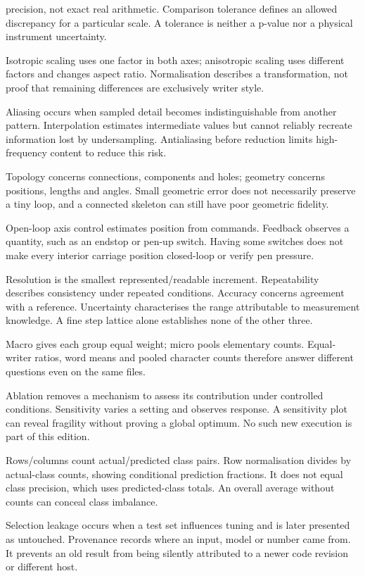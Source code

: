 \begin{description}[style=nextline]
precision, not exact real arithmetic. Comparison tolerance defines an allowed
discrepancy for a particular scale. A tolerance is neither a p-value nor a
physical instrument uncertainty.
\item[Isotropic versus anisotropic.] Isotropic scaling uses one factor in
both axes; anisotropic scaling uses different factors and changes aspect ratio.
Normalisation describes a transformation, not proof that remaining differences
are exclusively writer style.
\item[Aliasing and interpolation.] Aliasing occurs when sampled detail becomes
indistinguishable from another pattern. Interpolation estimates intermediate
values but cannot reliably recreate information lost by undersampling.
Antialiasing before reduction limits high-frequency content to reduce this risk.
\item[Topology versus geometry.] Topology concerns connections, components and
holes; geometry concerns positions, lengths and angles. Small geometric error
does not necessarily preserve a tiny loop, and a connected skeleton can still
have poor geometric fidelity.
\item[Open-loop versus feedback.] Open-loop axis control estimates position
from commands. Feedback observes a quantity, such as an endstop or pen-up
switch. Having some switches does not make every interior carriage position
closed-loop or verify pen pressure.
\item[Resolution, repeatability, accuracy and uncertainty.] Resolution is the
smallest represented/readable increment. Repeatability describes consistency
under repeated conditions. Accuracy concerns agreement with a reference.
Uncertainty characterises the range attributable to measurement knowledge.
A fine step lattice alone establishes none of the other three.
\item[Macro and micro aggregation.] Macro gives each group equal weight;
micro pools elementary counts. Equal-writer ratios, word means and pooled
character counts therefore answer different questions even on the same files.
\item[Ablation and sensitivity.] Ablation removes a mechanism to assess its
contribution under controlled conditions. Sensitivity varies a setting and
observes response. A sensitivity plot can reveal fragility without proving a
global optimum. No such new execution is part of this edition.
\item[Confusion matrix.] Rows/columns count actual/predicted class pairs.
Row normalisation divides by actual-class counts, showing conditional prediction
fractions. It does not equal class precision, which uses predicted-class totals.
An overall average without counts can conceal class imbalance.
\item[Selection leakage and provenance.] Selection leakage occurs when a test
set influences tuning and is later presented as untouched. Provenance records
where an input, model or number came from. It prevents an old result from being
silently attributed to a newer code revision or different host.
\end{description}

